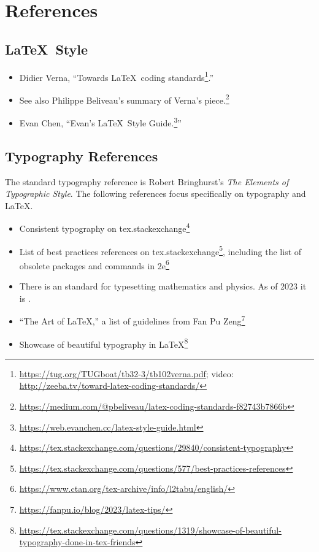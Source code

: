 
\section{References}

\subsection{\texorpdfstring{\LaTeX\ Style}{LaTeX Style}}

\begin{itemize}
    \item Didier Verna, ``Towards \LaTeX\ coding standards\footnote{\url{https://tug.org/TUGboat/tb32-3/tb102verna.pdf}; video: \url{http://zeeba.tv/toward-latex-coding-standards/}}.'' 
    \item See also Philippe Beliveau's summary of Verna's piece.\footnote{\url{https://medium.com/@pbeliveau/latex-coding-standards-f82743b7866b}}
    \item Evan Chen, ``Evan's \LaTeX\ Style Guide.\footnote{\url{https://web.evanchen.cc/latex-style-guide.html}}''
\end{itemize}


\subsection{Typography References}

The standard typography reference is Robert Bringhurst's \emph{The Elements of Typographic Style}. 
The following references focus specifically on typography and \LaTeX.
\begin{itemize}
    \item Consistent typography on tex.stackexchange\footnote{\url{https://tex.stackexchange.com/questions/29840/consistent-typography}}
    \item List of best practices references on tex.stackexchange\footnote{\url{https://tex.stackexchange.com/questions/577/best-practices-references}}, including the list of obsolete packages and commands in 2e\footnote{\url{https://www.ctan.org/tex-archive/info/l2tabu/english/}}
    \item There is an  standard for typesetting mathematics and physics. As of 2023 it is .
    \item ``The Art of \LaTeX,'' a list of guidelines from Fan Pu Zeng\footnote{\url{https://fanpu.io/blog/2023/latex-tips/}}
    \item Showcase of beautiful typography in \LaTeX\footnote{\url{https://tex.stackexchange.com/questions/1319/showcase-of-beautiful-typography-done-in-tex-friends}}
\end{itemize}

